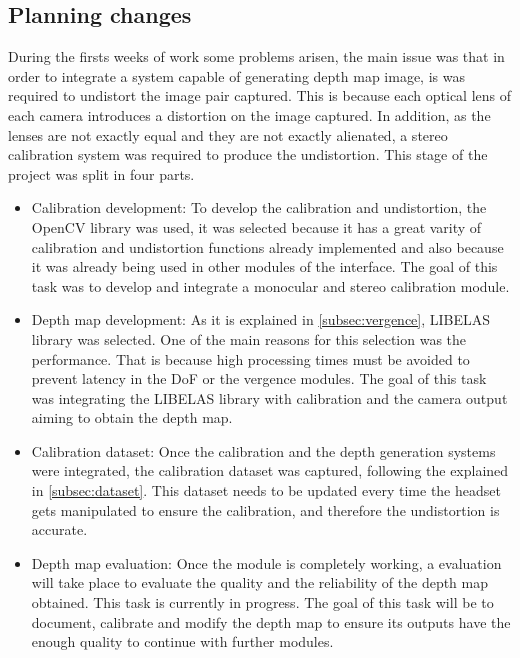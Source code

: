 \documentclass[10pt,a4paper,twocolumn,twoside]{article}
\begin{document}
	\subsection{Planning changes}
		
	During the firsts weeks of work some problems arisen, the main issue was that in order to integrate a system capable of generating depth map image, is was required to undistort the image pair captured. This is because each optical lens of each camera introduces a distortion on the image captured. In addition, as the lenses are not exactly equal and they are not exactly alienated, a stereo calibration system was required to produce the undistortion. This stage of the project was split in four parts.
	
	\begin{itemize}
		\item Calibration development: To develop the calibration and undistortion, the OpenCV library \cite{web:opencv} was used, it was selected because it has a great varity of calibration and undistortion functions already implemented and also because it was already being used in other modules of the interface. The goal of this task was to develop and integrate a monocular and stereo calibration module.
		
		\item Depth map development: As it is explained in \ref{subsec:vergence}, LIBELAS library was selected. One of the main reasons for this selection was the performance. That is because high processing times must be avoided to prevent latency in the DoF or the vergence modules. The goal of this task was integrating the LIBELAS library with calibration and the camera output aiming to obtain the depth map. 
		
		\item Calibration dataset: Once the calibration and the depth generation systems were integrated, the calibration dataset was captured, following the explained in \ref{subsec:dataset}. This dataset needs to be updated every time the headset gets manipulated to ensure the calibration, and therefore the undistortion is accurate.
		
		\item Depth map evaluation: Once the module is completely working, a evaluation will take place to evaluate the quality and the reliability of the depth map obtained. This task is currently in progress. The goal of this task will be to document, calibrate and modify the depth map to ensure its outputs have the enough quality to continue with further modules.
	\end{itemize}
\end{document}
